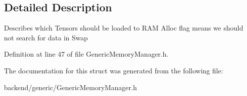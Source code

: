 \subsection{Detailed Description}
Describes which Tensors should be loaded to R\+AM Alloc flag means we should not search for data in Swap 

Definition at line 47 of file Generic\+Memory\+Manager.\+h.



The documentation for this struct was generated from the following file\+:\begin{DoxyCompactItemize}
\item 
backend/generic/Generic\+Memory\+Manager.\+h\end{DoxyCompactItemize}
